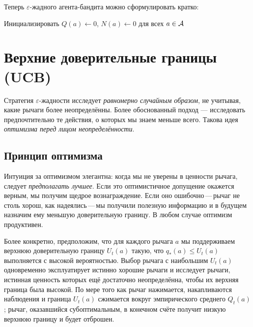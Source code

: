 Теперь $\varepsilon$-жадного агента-бандита можно сформулировать кратко:

\begin{algorithm}[ht]
\caption{$\varepsilon$-жадный агент-бандит}
\label{alg:eps-greedy}
Инициализировать $Q(a)\leftarrow 0$, $N(a)\leftarrow 0$ для всех $a\in\mathcal{A}$\;
\end{algorithm}


\section{Верхние доверительные границы (UCB)}
\label{sec:ucb}

Стратегия $\varepsilon$-жадности исследует \emph{равномерно случайным образом}, не учитывая, какие рычаги более неопределённы.  Более обоснованный подход — исследовать предпочтительно те действия, о которых мы знаем меньше всего.  Такова идея \emph{оптимизма перед лицом неопределённости}.

\subsection*{Принцип оптимизма}

Интуиция за оптимизмом элегантна: когда мы не уверены в ценности рычага, следует \emph{предполагать лучшее}.  Если это оптимистичное допущение окажется верным, мы получим щедрое вознаграждение.  Если оно ошибочно\,---\,рычаг не столь хорош, как надеялись\,---\,мы получили полезную информацию и в будущем назначим ему меньшую доверительную границу.  В любом случае оптимизм продуктивен.

Более конкретно, предположим, что для каждого рычага $a$ мы поддерживаем верхнюю доверительную границу $U_t(a)$ такую, что $q_*(a) \le U_t(a)$ выполняется с высокой вероятностью.  Выбор рычага с наибольшим $U_t(a)$ одновременно эксплуатирует истинно хорошие рычаги и исследует рычаги, истинная ценность которых ещё достаточно неопределённа, чтобы их верхняя граница была высокой.  По мере того как рычаг нажимается, накапливаются наблюдения и граница $U_t(a)$ сжимается вокруг эмпирического среднего $Q_t(a)$; рычаг, оказавшийся субоптимальным, в конечном счёте получит низкую верхнюю границу и будет отброшен.

